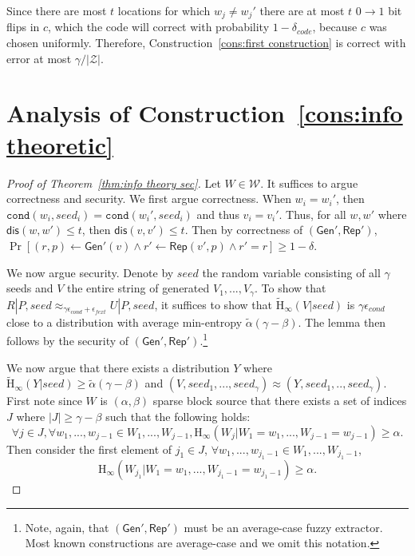 \documentclass[11pt]{article}
\newcommand{\consref}[1]{\mbox{Construction~\ref{#1}}}
\newcommand{\class}[1]{{\ensuremath{\mathsf{#1}}}}
\newcommand{\gen}{\ensuremath{\class{Gen}}\xspace}
\newcommand{\rep}{\ensuremath{\class{Rep}}\xspace}
\newcommand{\dis}{\ensuremath{\mathsf{dis}}}
\newcommand{\Hoo}{\mathrm{H}_\infty}
\newcommand{\Hav}{\tilde{\mathrm{H}}_\infty}
\newcommand{\cond}{\ensuremath{\mathtt{cond}}}
\begin{document}
Since there are most $t$ locations for which $w_j\neq w_j'$ there are at most $t$ $0\rightarrow 1$ bit flips in $c$, which the code will correct with probability $1-\delta_{code}$, because $c$ was chosen uniformly.
Therefore, \consref{cons:first construction} is correct with error at most $\gamma/|\mathcal{Z}|$.



\section{Analysis of \consref{cons:info theoretic}}
\label{sec:info theory sec}
\begin{proof}[Proof of Theorem~\ref{thm:info theory sec}]
Let $W\in \mathcal{W}$.
It suffices to argue correctness and security.  We first argue correctness.
When $w_i = w_i'$, then $\cond(w_i , seed_i) = \cond(w_i', seed_i)$ and thus $v_i = v_i'$.  Thus, for all $w, w'$ where $\dis(w, w')\le t$, then $\dis (v, v')\le t$.  Then by correctness of $(\gen', \rep')$, $\Pr[(r, p)\leftarrow \gen'(v) \wedge r'\leftarrow \rep(v',p) \wedge r' = r]\ge 1-\delta$.

We now argue security.  Denote by $seed$ the random variable consisting of all $\gamma$ seeds and $V$ the entire string of generated $V_1,..., V_\gamma$.  To show that $R | P, seed \approx_{\gamma \epsilon_{cond} + \epsilon_{fext}} U | P, seed$, it suffices to show that $\Hav(V | seed)$ is $\gamma \epsilon_{cond}$ close to a distribution with average min-entropy $\tilde{\alpha}(\gamma - \beta)$.  The lemma then follows by the security of $(\gen', \rep')$.\footnote{Note, again, that $(\gen', \rep')$ must be an average-case fuzzy extractor.  Most known constructions are average-case and we omit this notation.}

We now argue that there exists a distribution $Y$ where $\Hav(Y | seed)\ge \tilde{\alpha}(\gamma - \beta)$ and $(V, seed_1,..., seed_\gamma)\approx (Y, seed_1,.., seed_\gamma)$.  First note since $W$ is $(\alpha, \beta)$ sparse block source that
there exists a set of indices $J$ where $|J| \geq \gamma - \beta$ such that the following holds:
\[
\forall j\in J, \forall w_1,..., w_{j-1} \in W_1,..., W_{j-1}, \Hoo(W_j | W_1 = w_1,..., W_{j-1}=w_{j-1}) \geq \alpha.
\]
Then consider the first element of $j_1\in J$, $\forall w_1,..., w_{j_1-1}\in W_1,..., W_{j_1-1}$,
\[\Hoo(W_{j_1} | W_1 = w_1,..., W_{j_1-1} = w_{j_1-1})\ge \alpha.\]


\end{proof}
\end{document}
